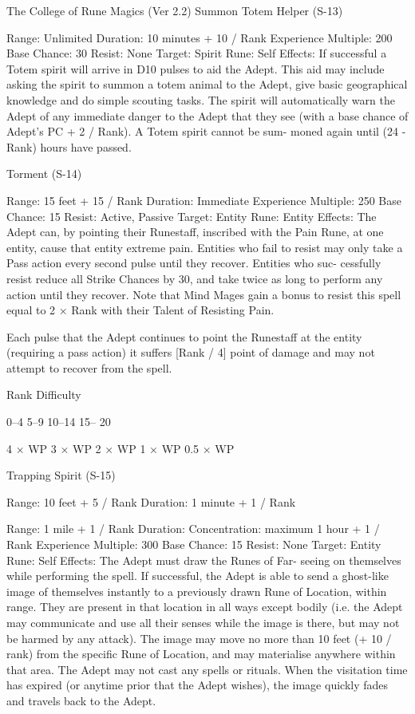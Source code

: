 \begin{Chapter}{The College of Rune Magics (Ver 2.2)}
Summon Totem Helper (S-13) 

Range: Unlimited 
Duration: 10 minutes + 10 / Rank 
Experience Multiple: 200 
Base Chance: 30%
Resist: None 
Target: Spirit 
Rune: Self 
Effects:  If  successful  a  Totem  spirit  will  arrive  in 
D10 pulses to aid the Adept. This aid may include 
asking  the  spirit to  summon  a  totem animal  to  the 
Adept,  give  basic  geographical  knowledge  and  do 
simple scouting tasks. The spirit will automatically 
warn  the  Adept  of  any  immediate  danger  to  the 
Adept that they see (with a base chance of Adept’s 
PC  +  2  /  Rank).  A  Totem  spirit  cannot  be  sum-
moned again until (24 - Rank) hours have passed. 

Torment (S-14) 

Range: 15 feet + 15 / Rank 
Duration: Immediate 
Experience Multiple: 250 
Base Chance: 15%
Resist: Active, Passive 
Target: Entity 
Rune: Entity 
Effects:  The  Adept  can,  by  pointing 
their 
Runestaff,  inscribed  with  the  Pain  Rune,  at  one 
entity, cause that entity extreme pain. Entities who 
fail  to  resist  may  only  take  a  Pass  action  every 
second  pulse  until  they  recover.  Entities  who  suc-
cessfully  resist  reduce  all  Strike  Chances  by  30, 
and take  twice  as  long  to perform any  action until 
they  recover.  Note  that  Mind  Mages  gain  a  bonus 
to  resist  this  spell  equal  to  2  ×  Rank  with  their 
Talent of Resisting Pain. 

Each  pulse  that  the  Adept  continues  to  point  the 
Runestaff  at  the  entity  (requiring  a  pass  action)  it 
suffers  [Rank  /  4]  point  of  damage  and  may  not 
attempt to recover from the spell. 

Rank  Difficulty 

0–4 
5–9 
10–14 
15– 
20 

4 × WP 
3 × WP 
2 × WP 
1 × WP 
0.5 × WP 

Trapping Spirit (S-15) 

Range: 10 feet + 5 / Rank 
Duration: 1 minute + 1 / Rank 

Range: 1 mile + 1 / Rank 
Duration:  Concentration:  maximum  1  hour  +  1  / 
Rank 
Experience Multiple: 300 
Base Chance: 15%
Resist: None 
Target: Entity  
Rune: Self 
Effects:  The  Adept  must  draw  the  Runes  of  Far-
seeing on themselves while performing the spell. If 
successful,  the  Adept  is  able  to  send  a  ghost-like 
image  of  themselves  instantly  to  a  previously 
drawn  Rune  of  Location,  within  range.  They  are 
present  in  that  location  in  all  ways  except  bodily 
(i.e.  the  Adept  may  communicate  and use  all  their 
senses  while  the  image  is  there,  but  may  not  be 
harmed  by  any  attack).  The  image  may  move  no 
more  than  10  feet  (+  10  /  rank)  from  the  specific 
Rune  of  Location,  and  may  materialise  anywhere 
within that area. The Adept may not cast any spells 
or rituals. When the visitation time has expired (or 
anytime  prior  that  the  Adept  wishes),  the  image 
quickly fades and travels back to the Adept. 


\end{Chapter}
